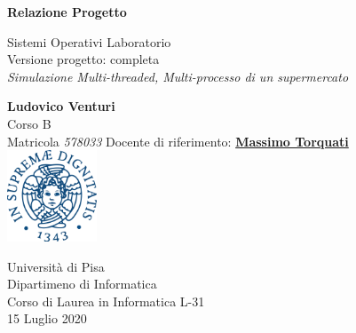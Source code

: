 \documentclass[11pt, a4paper]{article}
\begin{document}
\begin{titlepage}
    \begin{center}
        \vspace*{1cm}
            
        \Huge
        \textbf{Relazione Progetto}
            
        \vspace{0.5cm}
        \LARGE
        Sistemi Operativi Laboratorio\\
        \large
        \vspace{0.5cm}
        Versione progetto: completa\\
        \vspace{0.2cm}
        \textit{Simulazione Multi-threaded, Multi-processo di un supermercato}\\
        \vspace{1cm}
        \LARGE
            
        \textbf{Ludovico Venturi}\\
         \vspace{0.5cm}
         \Large
        Corso B\\
        Matricola \textit{578033}
        \small
        \tableofcontents
        \LARGE
        \vfill
        Docente di riferimento: \href{http://calvados.di.unipi.it/paragroup/torquati/}{\textbf{Massimo Torquati}}\\
        
        \vspace{1cm}            
        \includegraphics[width=0.2\textwidth]{unipi}
        \vspace{1cm}
            
        \large
		Università di Pisa\\
        Dipartimeno di Informatica\\
		Corso di Laurea in Informatica L-31 \\
        15 Luglio 2020
         \vspace{1.5cm}
            
    \end{center}
\end{titlepage}
\clearpage
\end{document}
